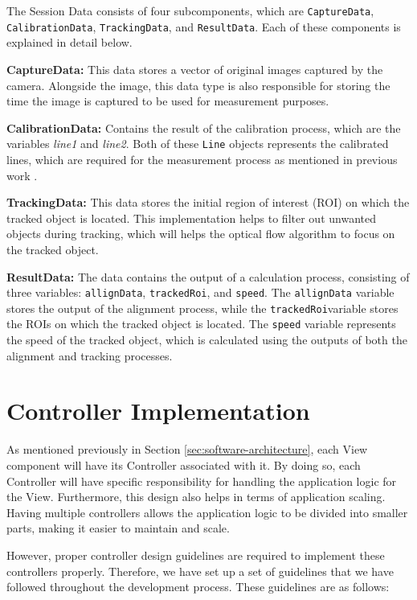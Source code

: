 The Session Data consists of four subcomponents, which are \texttt{CaptureData}, \texttt{CalibrationData}, \texttt{TrackingData}, and \texttt{ResultData}. Each of these components is explained in detail below.

\textbf{CaptureData:} This data stores a vector of original images captured by the camera. Alongside the image, this data type is also responsible for storing the time the image is captured to be used for measurement purposes.

\textbf{CalibrationData:} Contains the result of the calibration process, which are the variables \textit{line1} and \textit{line2}. Both of these \texttt{Line} objects represents the calibrated lines, which are required for the measurement process as mentioned in previous work \cite{Sabtu_2023}.

\textbf{TrackingData:} This data stores the initial region of interest (ROI) on which the tracked object is located. This implementation helps to filter out unwanted objects during tracking, which will helps the optical flow algorithm to focus on the tracked object.

\textbf{ResultData:} The data contains the output of a calculation process, consisting of three variables: \texttt{allignData}, \texttt{trackedRoi}, and \texttt{speed}. The \texttt{allignData} variable stores the output of the alignment process, while the \texttt{trackedRoi}variable stores the ROIs on which the tracked object is located. The \texttt{speed} variable represents the speed of the tracked object, which is calculated using the outputs of both the alignment and tracking processes.

\section{Controller Implementation}
\label{sec:controller_implementation}

As mentioned previously in Section \ref{sec:software-architecture}, each View component will have its Controller associated with it. By doing so, each Controller will have specific responsibility for handling the application logic for the View. Furthermore, this design also helps in terms of application scaling. Having multiple controllers allows the application logic to be divided into smaller parts, making it easier to maintain and scale.

However, proper controller design guidelines are required to implement these controllers properly. Therefore, we have set up a set of guidelines that we have followed throughout the development process. These guidelines are as follows:

